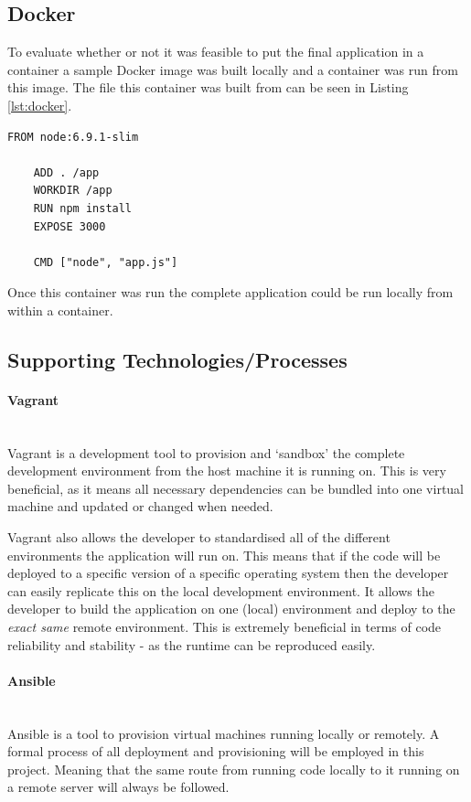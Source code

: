 \subsection{Docker}
To evaluate whether or not it was feasible to put the final application in a container a sample Docker image was built locally and a container was run from this image. The file this container was built from can be seen in Listing \ref{lst:docker}.

\begin{lstlisting}[caption={Creating a Docker Image},label={lst:docker}]
	FROM node:6.9.1-slim

	ADD . /app  
	WORKDIR /app  
	RUN npm install  
	EXPOSE 3000

	CMD ["node", "app.js"]  
\end{lstlisting}

Once this container was run the complete application could be run locally from within a container.

\subsection{Supporting Technologies/Processes}
\label{subs:support}
\paragraph{Vagrant}\mbox{}\\
Vagrant is a development tool to provision and `sandbox' the complete development environment from the host machine it is running on. This is very beneficial, as it means all necessary dependencies can be bundled into one virtual machine and updated or changed when needed. 

Vagrant also allows the developer to standardised all of the different environments the application will run on. This means that if the code will be deployed to a specific version of a specific operating system then the developer can easily replicate this on the local development environment. It allows the developer to build the application on one (local) environment and deploy to the \textit{exact same} remote environment. This is extremely beneficial in terms of code reliability and stability - as the runtime can be reproduced easily.
\paragraph{Ansible}\mbox{}\\
Ansible is a tool to provision virtual machines running locally or remotely. A formal process of all deployment and provisioning will be employed in this project. Meaning that the same route from running code locally to it running on a remote server will always be followed.

